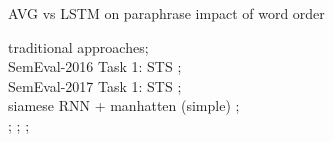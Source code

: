 AVG vs LSTM on paraphrase \autocite{wieting_towards_2015}
impact of word order \autocite{pham_sentence_2013}

traditional approaches; \\
SemEval-2016 Task 1: STS \autocite{agirre_semeval-2016_2016}; \\
SemEval-2017 Task 1: STS \autocite{cer_semeval-2017_2017}; \\

siamese RNN + manhatten (simple) \autocite{mueller_siamese_2016}; \\

\autocite{habernal_exploiting_2015};
\autocite{boltuzic_identifying_2015};
\autocite{misra_measuring_2016};




